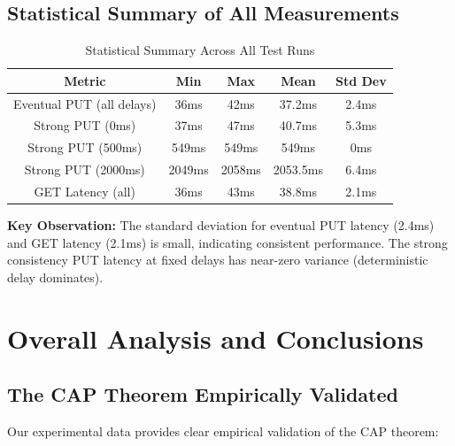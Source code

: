 \documentclass[10pt,a4paper]{article}
\begin{document}
\subsection{Statistical Summary of All Measurements}

\begin{table}[H]
\centering
\caption{Statistical Summary Across All Test Runs}
\begin{tabular}{|c|c|c|c|c|}
\hline
\textbf{Metric} & \textbf{Min} & \textbf{Max} & \textbf{Mean} & \textbf{Std Dev} \\
\hline
Eventual PUT (all delays) & 36ms & 42ms & 37.2ms & 2.4ms \\
\hline
Strong PUT (0ms) & 37ms & 47ms & 40.7ms & 5.3ms \\
\hline
Strong PUT (500ms) & 549ms & 549ms & 549ms & 0ms \\
\hline
Strong PUT (2000ms) & 2049ms & 2058ms & 2053.5ms & 6.4ms \\
\hline
GET Latency (all) & 36ms & 43ms & 38.8ms & 2.1ms \\
\hline
\end{tabular}
\end{table}

\textbf{Key Observation:} The standard deviation for eventual PUT latency (2.4ms) and GET latency (2.1ms) is small, indicating consistent performance. The strong consistency PUT latency at fixed delays has near-zero variance (deterministic delay dominates).

\newpage

\section{Overall Analysis and Conclusions}

\subsection{The CAP Theorem Empirically Validated}

Our experimental data provides clear empirical validation of the CAP theorem:
\end{document}
